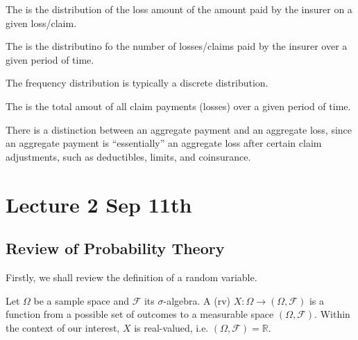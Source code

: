 \documentclass[notoc,notitlepage]{tufte-book}
\begin{document}
\begin{defn}\label{defn:severity_distribution}
  The  is the distribution of the loss amount of the amount paid by the insurer on a given loss/claim.
\end{defn}

\begin{defn}\label{defn:frequency_distribution}
  The  is the distributino fo the number of losses/claims paid by the insurer over a given period of time.
\end{defn}

\begin{note}
  The frequency distribution is typically a discrete distribution.
\end{note}

\begin{defn}\label{defn:aggrement_payment_loss}
  The  is the total amout of all claim payments (losses) over a given period of time.
\end{defn}

\begin{note}
  There is a distinction between an aggregate payment and an aggregate loss, since an aggregate payment is ``essentially'' an aggregate loss after certain claim adjustments, such as deductibles, limits, and coinsurance.
\end{note}



\chapter{Lecture 2 Sep 11th}%
\label{chp:lecture_2_sep_11th}

\section{Review of Probability Theory}%
\label{sec:review_of_probability_theory}

Firstly, we shall review the definition of a random variable.

\begin{defn}\label{defn:random_variable}
  Let $\Omega$ be a sample space and $\mathcal{F}$ its $\sigma$-algebra. A  (rv) $X : \Omega \to (\Omega, \mathcal{F})$ is a function from a possible set of outcomes to a measurable space $(\Omega, \mathcal{F})$. Within the context of our interest, $X$ is real-valued, i.e. $(\Omega, \mathcal{F}) = \mathbb{R}$.
\end{defn}
\end{document}
